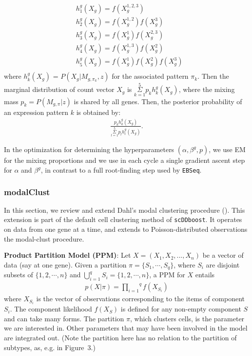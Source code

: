 \documentclass[aoas,preprint]{imsart}
\begin{document}
\begin{align*}
&h_1^{g}(X_g) = f(X_g^{1,2,3})\\
&h_2^{g}(X_g) = f(X_g^{1,2})f(X_g^3)\\
&h_3^{g}(X_g) = f(X_g^1)f(X_g^{2,3})\\
&h_4^{g}(X_g) = f(X_g^{1,3})f(X_g^2)\\
&h_5^{g}(X_g) = f(X_g^1)f(X_g^2)f(X_g^3)\\
\end{align*}
where $h_k^{g}(X_g)$ = $P(X_g | M_{g,\pi_k},z)$ for the  associated pattern $\pi_k$.
Then the marginal distribution of count vector $X_g$ is 
$\overset{5}{\underset{k = 1}{\Sigma}} p_k h_k^{g}(X_g)$, 
where the mixing mass $p_k = P(M_{g,\pi} | z)$ is shared by all genes. 
Then, the posterior probability of an expression pattern $k$ is obtained by:
\begin{eqnarray*}
\frac{p_k h^g_k(X_g)}{\overset{5}{\underset{l = 1}{\Sigma}} p_l h_l^{g}(X_g)}.
\end{eqnarray*}


In the optimization for determining the hyperparameters 
$(\alpha, \beta^g, p)$, we use EM for the mixing proportions and
we use in each cycle a single gradient ascent step for $\alpha$ and $\beta^g$, in 
contrast to a full root-finding step used by \verb+EBSeq+. 



\subsubsection*{modalClust}

In this section, we review and extend Dahl's modal clustering procedure  (\cite{ref:dahl}).
This extension is part of the default cell clustering method of \verb+scDDboost+.
It operates on data from one gene at a time, and extends to Poisson-distributed observations
the modal-clust procedure.

\noindent
{\bf Product Partition Model (PPM)}:
Let $X = (X_1, X_2, ...,X_n)$ be a vector of data (say at one gene). 
Given a partition $\pi = \{S_1, \cdots, S_q\}$, where $S_i$ are disjoint subsets 
of $\{1,2,\cdots,n\}$ and $\bigcup_{i = 1}^{q} S_i = \{1,2,\cdots,n\}$, a PPM 
for $X$ entails
\begin{eqnarray*}
p(X|\pi) = \overset{q}{\underset{i = 1}{\prod}}f(X_{S_i})
\end{eqnarray*}
where $X_{S_i}$ is the vector of observations corresponding to the items of component $S_i$. The component likelihood $f(X_{S})$ is defined for any non-empty component $S$ and can take many forms. 
The partition $\pi$, which clusters cells,  is the parameter we are interested in.
Other parameters that may have been involved in the model are integrated out.
(Note the partition here has no relation to the partition of subtypes, as, e.g. in Figure~3.)
\end{document}
